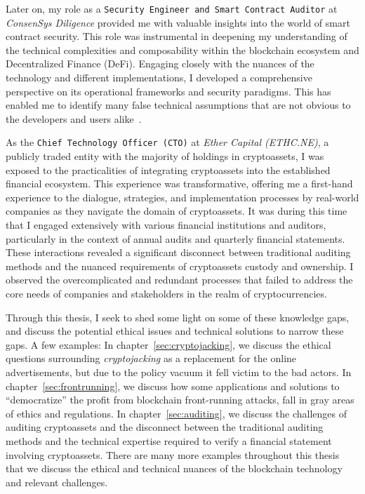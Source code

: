 Later on, my role as a \texttt{Security Engineer and Smart Contract Auditor} at \textit{ConsenSys Diligence} provided me with valuable insights into the world of smart contract security. This role was instrumental in deepening my understanding of the technical complexities and composability within the blockchain ecosystem and Decentralized Finance (DeFi). Engaging closely with the nuances of the technology and different implementations, I developed a comprehensive perspective on its operational frameworks and security paradigms. This has enabled me to identify many false technical assumptions that are not obvious to the developers and users alike~\cite{shayantokenChecklist,shayanENSaudit}. 


As the \texttt{Chief Technology Officer (CTO)} at \textit{Ether Capital (ETHC.NE)}, a publicly traded entity with the majority of holdings in cryptoassets, I was exposed to the practicalities of integrating cryptoassets into the established financial ecosystem. This experience was transformative, offering me a first-hand experience to the dialogue, strategies, and implementation processes by real-world companies as they navigate the domain of cryptoassets. It was during this time that I engaged extensively with various financial institutions and auditors, particularly in the context of annual audits and quarterly financial statements. These interactions revealed a significant disconnect between traditional auditing methods and the nuanced requirements of cryptoassets custody and ownership. I observed the overcomplicated and redundant processes that failed to address the core needs of companies and stakeholders in the realm of cryptocurrencies.

Through this thesis, I seek to shed some light on some of these knowledge gaps, and discuss the potential ethical issues and technical solutions to narrow these gaps. A few examples: In chapter~\ref{sec:cryptojacking}, we discuss the ethical questions surrounding \textit{cryptojacking} as a replacement for the online advertisements, but due to the policy vacuum it fell victim to the bad actors. In chapter~\ref{sec:frontrunning}, we discuss how some applications and solutions to ``democratize'' the profit from blockchain front-running attacks, fall in gray areas of ethics and regulations. In chapter~\ref{sec:auditing}, we discuss the challenges of auditing cryptoassets and the disconnect between the traditional auditing methods and the technical expertise required to verify a financial statement involving cryptoassets. There are many more examples throughout this thesis that we discuss the ethical and technical nuances of the blockchain technology and relevant challenges.

